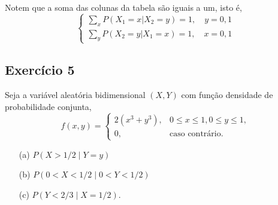 \documentclass{article}
\begin{document}
Notem que a soma das colunas da tabela são iguais a um, isto é,
    \[
    \left\{
    \begin{array}{l}
    \sum_x P(X_1 = x|X_2 = y) = 1, \quad y = 0, 1 \\
    \sum_y P(X_2 = y|X_1 = x) = 1, \quad x = 0, 1
    \end{array}
    \right.
    \]

\subsection{Exercício 5}
Seja a variável aleatória bidimensional $(X, Y)$ com função densidade de probabilidade conjunta,
    $$
    f(x,y) = 
    \begin{cases}
    2(x^3 + y^3), & 0 \le x \le 1, 0 \le y \le 1,\\
    0, & \text{caso contrário}.
    \end{cases}
    $$

\begin{enumerate}
    \item[(a)] $P(X > 1/2 \mid Y = y)$
    \item[(b)] $P(0 < X < 1/2 \mid 0 < Y < 1/2)$
    \item[(c)] $P(Y < 2/3 \mid X = 1/2)$.
\end{enumerate}
\end{document}
